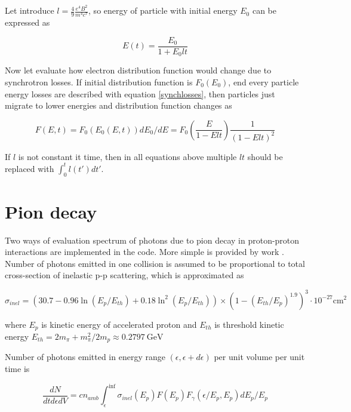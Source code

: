 Let introduce $l = \frac{4}{9} \frac{e^4 B^2}{m^4 c^7}$, so energy of particle with initial energy $E_0$ can be expressed as

\begin{equation}
	E(t) = \frac{E_0}{1 + E_0 l t}
\end{equation}

Now let evaluate how electron distribution function would change due to synchrotron losses. If initial distribution function is $F_0(E_0)$, end every particle energy losses are described with equation \ref{synchlosses}, then particles just migrate to lower energies and distribution function changes as

\begin{equation}
	F(E,t) = F_0\left(E_0(E,t)\right) dE_0/dE = F_0\left(\frac{E}{1-E l t}\right)\frac{1}{\left(1 - E l t\right)^2}
\end{equation}

If $l$ is not constant it time, then in all equations above multiple $l t$ should be replaced with $\int_0^t l(t')dt'$.

\section{Pion decay}\label{PionFormulaeSection}

Two ways of evaluation spectrum of photons due to pion decay in proton-proton interactions are implemented in the code. More simple is provided by work \cite{Kelner}. Number of photons emitted in one collision is assumed to be proportional to total cross-section of inelastic p-p scattering, which is approximated as \cite{Kafexhiu}

\begin{equation}\label{sigmainel}
	\sigma_{inel} = \left(30.7 - 0.96\ln\left(E_p/E_{th}\right) + 0.18\ln^2\left(E_p/E_{th}\right) \right)\times\left(1 - \left(E_{th}/E_p\right)^{1.9}\right)^3\cdot10^{-27} \text{cm}^{2}
\end{equation}

where $E_p$ is kinetic energy of accelerated proton and $E_{th}$ is threshold kinetic energy $E_{th} = 2m_{\pi}+m^2_{\pi}/2m_p \approx 0.2797~\text{GeV}$

Number of photons emitted in energy range $\left(\epsilon, \epsilon+d\epsilon\right)$ per unit volume per unit time is

\begin{equation}
	\frac{dN}{dt d\epsilon dV} = c n_{amb} \int_{\epsilon}^{\inf}\sigma_{inel}(E_p)F(E_p)F_{\gamma}(\epsilon/E_p, E_p) dE_p/E_p
\end{equation} 

